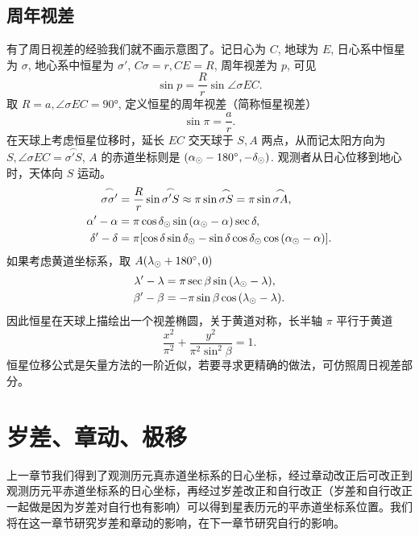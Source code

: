 \documentclass[UTF8, 12pt, a4paper, oneside, onecolumn, fontset=none]{ctexart}
\begin{document}
\subsection{周年视差}
有了周日视差的经验我们就不画示意图了。记日心为 $C$, 地球为 $E$, 日心系中恒星为 $\sigma$, 地心系中恒星为 $\sigma'$, $C\sigma=r, CE=R$, 周年视差为 $p$, 可见
\begin{equation}
\sin{p}=\frac{R}{r}\sin{\angle{\sigma{}EC}}.
\end{equation}
取 $R=a,\angle{\sigma{}EC}=\ang{90;;}$, 定义恒星的周年视差（简称恒星视差）
\begin{equation}
\sin{\pi}=\frac{a}{r}.
\end{equation}
在天球上考虑恒星位移时，延长 $EC$ 交天球于 $S, A$ 两点，从而记太阳方向为 $S,\angle{\sigma{}EC}=\overset{\frown}{\sigma'S}$, $A$ 的赤道坐标则是 $\mleft(\alpha_{\odot}-\ang{180;;},-\delta_{\odot}\mright)$. 观测者从日心位移到地心时，天体向 $S$ 运动。
\begin{align}
\overset{\frown}{\sigma\sigma'}&=\frac{R}{r}\sin{\overset{\frown}{\sigma'S}}\approx\pi\sin{\overset{\frown}{\sigma{}S}}=\pi\sin{\overset{\frown}{\sigma{}A}},\\
\alpha'-\alpha&=\pi\cos{\delta_{\odot}}\sin{\mleft(\alpha_{\odot}-\alpha\mright)}\sec{\delta},\\
\delta'-\delta&=\pi\mleft[\cos{\delta}\sin{\delta_{\odot}}-\sin{\delta}\cos{\delta_{\odot}}\cos{\mleft(\alpha_{\odot}-\alpha\mright)}\mright].
\end{align}
如果考虑黄道坐标系，取 $A\mleft(\lambda_{\odot}+\ang{180;;}, 0\mright)$
\begin{align}
\lambda'-\lambda&=\pi\sec{\beta}\sin{\mleft(\lambda_{\odot}-\lambda\mright)},\\
\beta'-\beta&=-\pi\sin{\beta}\cos{\mleft(\lambda_{\odot}-\lambda\mright)}.
\end{align}
因此恒星在天球上描绘出一个视差椭圆，关于黄道对称，长半轴 $\pi$ 平行于黄道
\begin{equation}
\frac{x^{2}}{\pi^{2}}+\frac{y^{2}}{\pi^{2}\sin^{2}{\beta}}=1.
\end{equation}
恒星位移公式是矢量方法的一阶近似，若要寻求更精确的做法，可仿照周日视差部分。

\section{岁差、章动、极移}
上一章节我们得到了观测历元真赤道坐标系的日心坐标，经过章动改正后可改正到观测历元平赤道坐标系的日心坐标，再经过岁差改正和自行改正（岁差和自行改正一起做是因为岁差对自行也有影响）可以得到星表历元的平赤道坐标系位置。我们将在这一章节研究岁差和章动的影响，在下一章节研究自行的影响。
\end{document}
